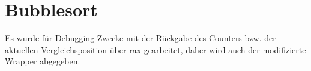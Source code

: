 \documentclass[11pt]{article}
\begin{document}
\newpage
\section{Bubblesort}
Es wurde für Debugging Zwecke mit der Rückgabe des Counters bzw. der aktuellen Vergleichsposition über rax gearbeitet, daher wird auch der modifizierte Wrapper abgegeben.

\newpage

\end{document}
